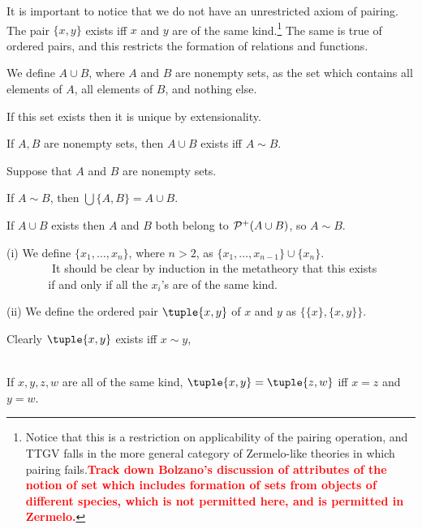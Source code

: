 \documentclass[12pt]{article}
\begin{document}
It is important to notice that we do not have an unrestricted axiom of pairing.  The pair $\{x,y\}$ exists iff $x$ and $y$ are of the same kind.\footnote{Notice that this is a restriction on applicability of the pairing operation, and TTGV falls in the more general category of Zermelo-like theories in which pairing fails.{\bf  \textcolor{red}{Track down Bolzano's discussion of attributes of the notion of set which includes formation of sets from objects of different species, which is not permitted here, and is permitted in Zermelo.}}}  The same is true of ordered pairs, and this restricts the formation of relations and functions.

\begin{dfn}  We define $A \cup B$, where $A$ and $B$ are nonempty sets, as the set which contains all elements of $A$, all elements of $B$, and nothing else.\end{dfn}
  If this set exists then it is unique by extensionality.

\begin{thm}  If $A,B$ are nonempty sets, then $A \cup B$ exists iff $A \sim B$.\end{thm}

\Proof

Suppose that $A$ and $B$ are nonempty sets.

If $A \sim B$, then $\bigcup \{A,B\} = A \cup B$.

If $A \cup B$ exists then $A$ and $B$ both belong to ${\cal P}^+(A
\cup B)$, so $A \sim B$.

\endproof


\begin{dfn}\mbox{\negthinspace}
  
(i)   We define $\{x_1,\ldots,x_n\}$, where $n>2$, as $\{x_1,\ldots,x_{n-1}\} \cup \{x_n\}$.\\  \mbox{\, \, \, \, \, \, }It should be clear by induction in the metatheory that this exists\\  \mbox{\, \,  \, \, \, } if and only if all the $x_i$'s are of the same kind.

(ii) We define the ordered pair $\tuple{x,y}$ of $x$ and $y$ as $\{\{x\},\{x,y\}\}$.  
\end{dfn}
Clearly $\tuple{x,y}$ exists iff $x \sim y$,

\begin{thm} \mbox{\negthinspace}\\ If $x,y,z,w$ are all of the same kind, $\tuple{x,y}=\tuple{z,w}$ iff $x=z$ and $y=w$.\end{thm}
\end{document}
